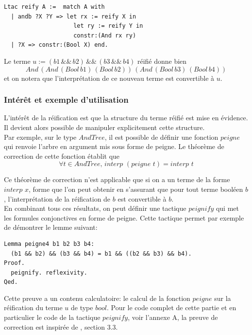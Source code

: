 \documentclass[11pt]{article}
\begin{document}
\begin{lstlisting}[frame=single]
Ltac reify A :=  match A with
  | andb ?X ?Y => let rx := reify X in
                    let ry := reify Y in
                    constr:(And rx ry)
  | ?X => constr:(Bool X) end.

\end{lstlisting}

Le terme $u := (b1\,\&\&\,b2)\,\&\&\,(b3\,\&\&\,b4)$ réifié donne bien 
\[And\,(And\,(Bool\,b1)\,(Bool\,b2))\,(And\,(Bool\,b3)\,(Bool\,b4))\] 
et on notera que l'interprétation de ce nouveau terme est convertible à $u$.



\subsubsection{Intérêt et exemple d'utilisation} \label{interet_reification}

L'intérêt de la réification est que la structure du terme réifié est mise en évidence. Il devient alors possible de manipuler explicitement cette structure. \\

Par exemple, sur le type $AndTree$, il est possible de définir une fonction $peigne$ qui renvoie l'arbre en argument mis sous forme de peigne. Le théorème de correction de cette fonction établit que 
\[ \forall t \in AndTree, \, interp \,\, (peigne \,\, t) = interp \,\, t \]

Ce théorème de correction n'est applicable que si on a un terme de la forme $interp \,\, x$, forme que l'on peut obtenir en s'assurant que pour tout terme booléen $b$, l'interprétation de la réification de $b$ est convertible à $b$.\\

En combinant tous ces résultats, on peut définir une tactique $peignify$ qui met les formules conjonctives en forme de peigne. Cette tactique permet par exemple de démontrer le lemme suivant: 

\begin{lstlisting}[frame=single]
Lemma peigne4 b1 b2 b3 b4:
  (b1 && b2) && (b3 && b4) = b1 && ((b2 && b3) && b4).
Proof.
  peignify. reflexivity.
Qed.
\end{lstlisting}
Cette preuve a un contenu calculatoire: le calcul de la fonction $peigne$ sur la réification du terme $u$ de type $bool$. Pour le code complet de cette partie et en particulier le code de la tactique $peignify$, voir l'annexe A, la preuve de correction est inspirée de \cite{coq_intro}, section 3.3.
\end{document}
